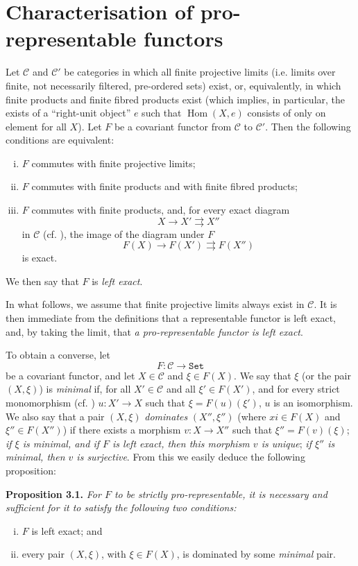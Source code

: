 \documentclass{article}
\newenvironment{itenv}[1]
  {\phantomsection\par\medskip\noindent\textbf{#1.}\itshape}
  {\par\medskip}
\renewcommand{\cal}[1]{{\mathcal{#1}}}
\newcommand{\Set}{\mathtt{Set}}
\DeclareMathOperator{\Hom}{Hom}
\newcommand{\oldpage}[1]{\marginpar{\footnotesize$\Big\vert$ \textit{p.~#1}}}
\begin{document}
\section{Characterisation of pro-representable functors}
\label{A.3}

Let $\cal{C}$ and $\cal{C}'$ be categories in which all finite projective limits (i.e. limits over finite, not necessarily filtered, pre-ordered sets) exist, or, equivalently, in which finite products and finite fibred products exist (which implies, in particular, the exists of a ``right-unit object'' $e$ such that $\Hom(X,e)$ consists of only on element for all $X$).
Let $F$ be a covariant functor from $\cal{C}$ to $\cal{C}'$.
Then the following conditions are equivalent:
\begin{enumerate}[(i)]
  \item $F$ commutes with finite projective limits;
  \item $F$ commutes with finite products and with finite fibred products;
  \item $F$ commutes with finite products, and, for every exact diagram
    \[
      X\to X'\rightrightarrows X''
    \]
    in $\cal{C}$ (cf. \cite[A, Definition 2.1]{3}), the image of the diagram under $F$
    \[
      F(X)\to F(X')\rightrightarrows F(X'')
    \]
    is exact.
\end{enumerate}
We then say that $F$ is \emph{left exact}.

In what follows, we assume that finite projective limits always exist in $\cal{C}$.
It is then immediate from the definitions that a representable functor is left exact, and, by taking the limit, that \emph{a pro-representable functor is left exact}.

To obtain a converse, let
\[
  F\colon \cal{C} \to \Set
\]
be a covariant functor, and let $X\in\cal{C}$ and $\xi\in F(X)$.
We say that $\xi$ (or the pair
\oldpage{195-06}
$(X,\xi)$) is \emph{minimal} if, for all $X'\in\cal{C}$ and all $\xi'\in F(X')$, and for every strict monomorphism (cf. \cite[A, \S2]{3}) $u\colon X'\to X$ such that $\xi=F(u)(\xi')$, $u$ is an isomorphism.
We also say that a pair $(X,\xi)$ \emph{dominates} $(X'',\xi'')$ (where $xi\in F(X)$ and $\xi''\in F(X'')$) if there exists a morphism $v\colon X\to X''$ such that $\xi''=F(v)(\xi)$;
\emph{if $\xi$ is minimal, and if $F$ is left exact, then this morphism $v$ is unique};
\emph{if $\xi''$ is minimal, then $v$ is surjective}.
From this we easily deduce the following proposition:

\begin{itenv}{Proposition 3.1}
\label{A.3-proposition1}
  For $F$ to be strictly pro-representable, it is necessary and sufficient for it to satisfy the following two conditions:
  \begin{enumerate}[(i)]
    \item $F$ is left exact; and
    \item every pair $(X,\xi)$, with $\xi\in F(X)$, is dominated by some \emph{minimal} pair.
  \end{enumerate}
\end{itenv}
\end{document}
